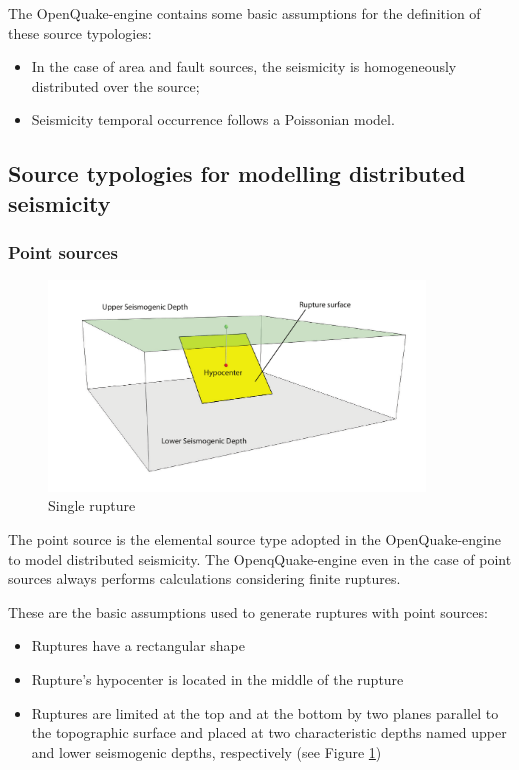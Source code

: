 The OpenQuake-engine contains some basic assumptions for the 
definition of these source typologies:
\begin{itemize}
	\item In the case of area and fault sources, the seismicity 
        is homogeneously distributed over the source; 	
	\item Seismicity temporal occurrence follows a Poissonian model. 
\end{itemize}
\subsection{Source typologies for modelling distributed seismicity}
\subsubsection{Point sources}
\label{hazard:seismic_source_types:pointSources}
\begin{figure}[!ht]
\centering
\includegraphics[width=10cm]{figures/hazard/single_rupture.pdf}
\caption{Single rupture}
\label{fig:single_rupture}
\end{figure}
The point source is the elemental source type adopted in the OpenQuake-engine 
to model distributed seismicity. The OpenqQuake-engine even in the case of 
point sources always performs calculations considering finite ruptures.

These are the basic assumptions used to generate ruptures with point 
sources:
%
\begin{itemize}
	\item Ruptures have a rectangular shape
	\item Rupture's hypocenter is located in the middle of the rupture
	\item Ruptures are limited at the top and at the bottom by two planes 
	parallel to the topographic surface and placed at two characteristic 
	depths named upper and lower seismogenic depths, respectively (see 
	Figure \ref{fig:single_rupture})
\end{itemize} 
%
